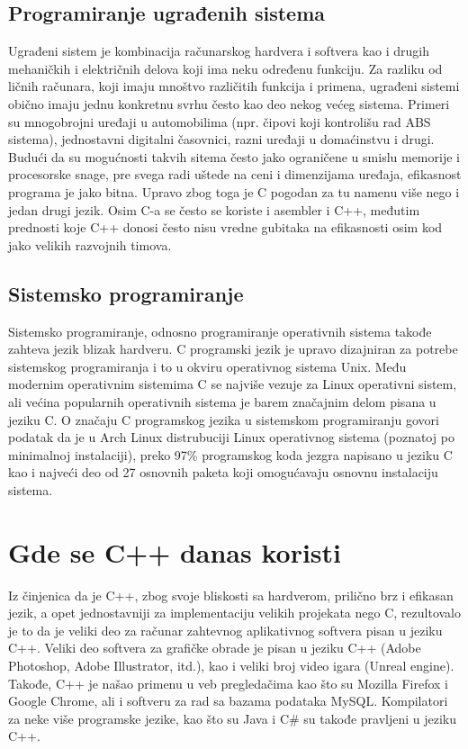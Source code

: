 \documentclass[a4paper]{article}
\begin{document}
{\subsection{Programiranje ugrađenih sistema}
Ugrađeni sistem je kombinacija računarskog hardvera i softvera kao i drugih mehaničkih i električnih
delova koji ima neku određenu funkciju. Za razliku od ličnih računara, koji imaju mnoštvo različitih funkcija i primena, ugrađeni sistemi obično imaju jednu konkretnu svrhu često kao deo nekog većeg sistema. Primeri su mnogobrojni uređaji u automobilima (npr. čipovi koji kontrolišu rad ABS sistema), jednostavni digitalni časovnici, razni uređaji u  domaćinstvu i drugi. Budući da su mogućnosti takvih sitema često jako ograničene u smislu memorije i procesorske snage, pre svega radi uštede na ceni i dimenzijama uređaja, efikasnost programa je jako bitna. Upravo zbog toga je C pogodan za tu namenu više nego i jedan drugi jezik. Osim C-a se često se koriste i asembler i C++, međutim prednosti koje C++ donosi često nisu vredne gubitaka na efikasnosti osim kod jako velikih razvojnih timova.

\subsection{Sistemsko programiranje}Sistemsko programiranje, odnosno programiranje operativnih sistema takođe zahteva jezik blizak hardveru. C programski jezik je upravo dizajniran za potrebe sistemskog programiranja i to u okviru operativnog sistema Unix. Među modernim operativnim sistemima C se najviše vezuje za Linux operativni sistem, ali većina popularnih operativnih sistema je barem značajnim delom pisana u jeziku C. O značaju C programskog jezika u sistemskom programiranju govori podatak da je u Arch Linux distrubuciji Linux operativnog sistema (poznatoj po minimalnoj instalaciji), preko 97\% programskog koda jezgra napisano u jeziku C kao i najveći deo od 27 osnovnih paketa koji omogućavaju osnovnu instalaciju sistema.

\section{Gde se C++ danas koristi}

Iz činjenica da je C++, zbog svoje bliskosti sa hardverom, prilično brz i efikasan jezik, a opet jednostavniji za implementaciju velikih projekata nego C, rezultovalo je to da je veliki deo za računar zahtevnog aplikativnog softvera pisan u jeziku C++. Veliki deo softvera za grafičke obrade je pisan u jeziku C++ (Adobe Photoshop, Adobe Illustrator, itd.), kao i veliki broj video igara (Unreal engine). Takođe, C++ je našao primenu u veb pregledačima kao što su Mozilla Firefox i Google Chrome, ali i softveru za rad sa bazama podataka MySQL. Kompilatori za neke više programske jezike, kao što su Java i C\# su takođe pravljeni u jeziku C++.

}
\end{document}
